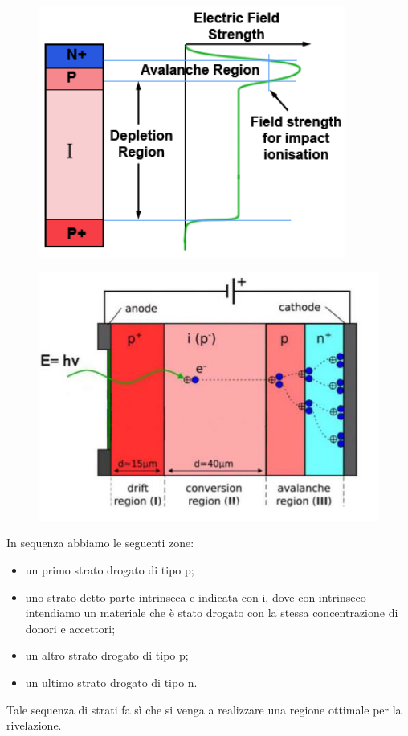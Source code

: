\begin{minipage}{0.5\textwidth}
   \begin{figure}[H]
      \centering
      \includegraphics[width=0.9\textwidth]{immagini/APD_1.png}
   \end{figure}
\end{minipage}
\begin{minipage}{0.5\textwidth}
   \begin{figure}[H]
      \centering
      \includegraphics[width=\textwidth]{immagini/APD_2.png}
   \end{figure}
\end{minipage}

\vspace{0.2cm}In sequenza abbiamo le seguenti zone:
\begin{itemize}
   \item un primo strato drogato di tipo p;
   \item uno strato detto parte intrinseca e indicata con i, dove con intrinseco intendiamo un materiale che è stato drogato con la stessa concentrazione di donori e accettori;
   \item un altro strato drogato di tipo p;
   \item un ultimo strato drogato di tipo n.
\end{itemize}
Tale sequenza di strati fa sì che si venga a realizzare una regione ottimale per la rivelazione.

